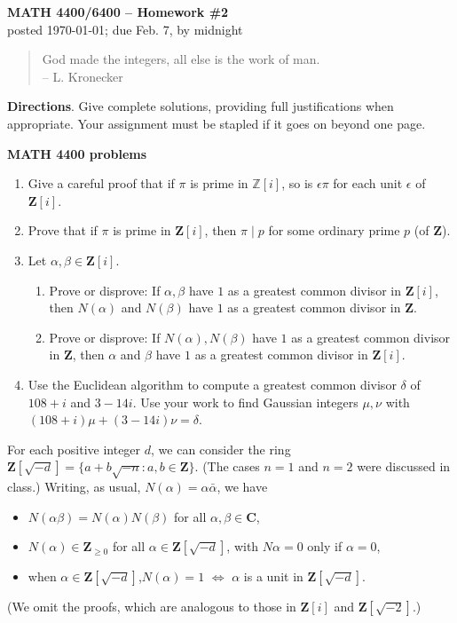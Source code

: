 \documentclass[12pt]{article}
\def\Z{\mathbf{Z}}
\def\C{\mathbf{C}}
\begin{document}
\thispagestyle{empty} \begin{center} {\textbf{MATH 4400/6400 --
Homework \#2}\\ posted \today; due Feb. 7, by midnight}
\end{center}

{\scriptsize \begin{quote} God made the integers, all else is the work of man. \\-- L. Kronecker\end{quote}}


\vskip 10pt \noindent\textbf{Directions}. Give complete solutions, providing full justifications when appropriate. Your assignment must be stapled if it goes on beyond one page.

\vskip 10pt \noindent\textbf{MATH 4400 problems}
\begin{enumerate}

\item Give a careful proof that if $\pi$ is prime in $\mathbb{Z}[i]$, so is $\epsilon \pi$ for each unit $\epsilon$ of $\Z[i]$.

\item Prove that if $\pi$ is prime in $\Z[i]$, then $\pi \mid p$ for some ordinary prime $p$ (of $\Z$).

\item Let $\alpha, \beta \in \Z[i]$.
\begin{enumerate}
\item Prove or disprove: If $\alpha, \beta$ have $1$ as a greatest common divisor in $\Z[i]$, then $N(\alpha)$ and $N(\beta)$ have $1$ as a greatest common divisor in $\Z$.
\item Prove or disprove: If $N(\alpha), N(\beta)$ have $1$ as a greatest common divisor in $\Z$, then $\alpha$ and $\beta$ have $1$ as a greatest common divisor in $\Z[i]$.
\end{enumerate}

\item Use the Euclidean algorithm to compute a greatest common divisor $\delta$ of $108+i$ and $3-14i$. Use your work to find Gaussian integers $\mu ,\nu$ with $(108+i)\mu + (3-14i)\nu = \delta$.

\end{enumerate}

\noindent For each positive integer $d$, we can consider the ring $\Z[\sqrt{-d}] = \{a+b\sqrt{-n}: a, b\in \Z\}$. (The cases $n=1$ and $n=2$ were discussed in class.) Writing, as usual, $N(\alpha)=\alpha\bar{\alpha}$, we have 
\begin{itemize}
    \item $N(\alpha\beta) = N(\alpha)N(\beta)$ for all $\alpha,\beta \in \C$,
    \item $N(\alpha) \in \Z_{\ge 0}$ for all $\alpha \in \Z[\sqrt{-d}]$, with $N\alpha = 0$ only if $\alpha=0$,
    \item when $\alpha \in \Z[\sqrt{-d}]$,\quad $N(\alpha)=1$ $\Longleftrightarrow$ $\alpha$ is a unit in $\Z[\sqrt{-d}]$.
\end{itemize}
(We omit the proofs, which are analogous to those in $\Z[i]$ and $\Z[\sqrt{-2}]$.)
\end{document}
